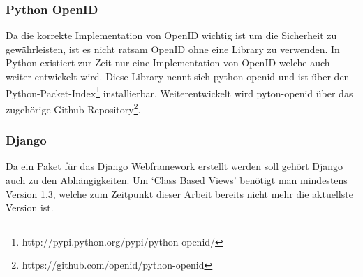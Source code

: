 \subsubsection{Python OpenID}
\label{ssub:Python OpenID}
Da die korrekte Implementation von OpenID wichtig ist um die Sicherheit zu
gewährleisten, ist es nicht ratsam OpenID ohne eine Library zu verwenden. In
Python existiert zur Zeit nur eine Implementation von OpenID welche auch weiter
entwickelt wird. Diese Library nennt sich python-openid und ist über den
Python-Packet-Index\footnote{http://pypi.python.org/pypi/python-openid/}
installierbar. Weiterentwickelt wird pyton-openid über das zugehörige Github
Repository\footnote{https://github.com/openid/python-openid}.

\subsubsection{Django}
\label{ssub:Django}
Da ein Paket für das Django Webframework erstellt werden soll gehört Django
auch zu den Abhängigkeiten. Um `Class Based Views' benötigt man mindestens
Version 1.3, welche zum Zeitpunkt dieser Arbeit bereits nicht mehr die
aktuellste Version ist.

